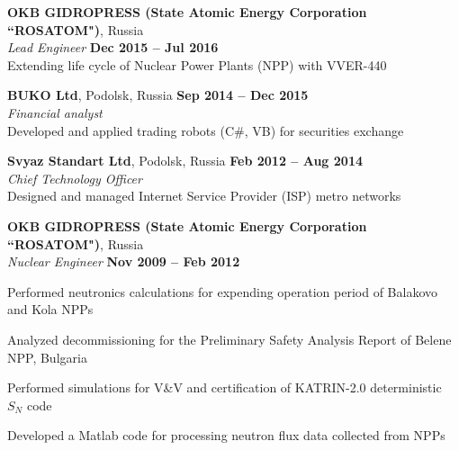 \documentclass[margin,line]{resume}
\begin{document}
\begin{resume}
    \textbf{OKB GIDROPRESS (State Atomic Energy Corporation ``ROSATOM")}, 
    Russia \\
		\textsl{Lead Engineer} \hfill \textbf{Dec 2015 -- Jul 2016}\\
                Extending life cycle of Nuclear Power Plants (NPP) with 
                VVER-440

    \textbf{BUKO Ltd}, Podolsk, Russia \hfill \textbf{Sep 2014 -- Dec 2015}\\
		\textsl{Financial analyst}\\
		Developed and applied trading robots (C\#, VB) for securities exchange

    \textbf{Svyaz Standart Ltd}, Podolsk, Russia \hfill \textbf{Feb 2012 -- Aug 2014}\\
		\textsl{Chief Technology Officer}\\
		Designed and managed Internet Service Provider (ISP) metro networks

    \textbf{OKB GIDROPRESS (State Atomic Energy Corporation ``ROSATOM")}, 
    Russia \\
		\textsl{Nuclear Engineer} \hfill \textbf{Nov 2009 -- Feb 2012}\\
                \vspace{-4mm}\begin{list2}
				\item Performed neutronics calculations for expending 
				operation period of Balakovo and Kola NPPs
				\item Analyzed decommissioning for the Preliminary Safety 
				Analysis Report of Belene NPP, Bulgaria
				\item Performed simulations for V\&V and certification of  
				KATRIN-2.0 deterministic $S_N$ code
				\item Developed a Matlab code for processing neutron flux data 
				collected from NPPs
                \end{list2}


\end{resume}
\end{document}
